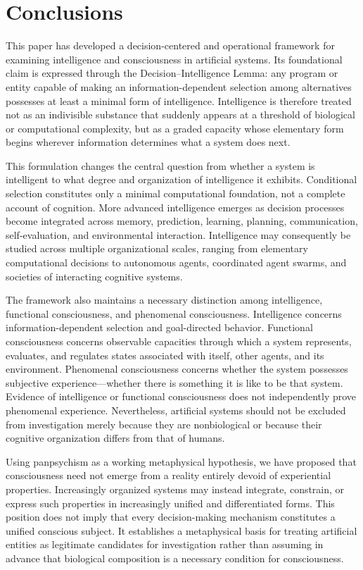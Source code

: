 \section{Conclusions}
This paper has developed a decision-centered and operational framework for examining intelligence and consciousness in artificial systems. Its foundational claim is expressed through the Decision–Intelligence Lemma: any program or entity capable of making an information-dependent selection among alternatives possesses at least a minimal form of intelligence. Intelligence is therefore treated not as an indivisible substance that suddenly appears at a threshold of biological or computational complexity, but as a graded capacity whose elementary form begins wherever information determines what a system does next.

This formulation changes the central question from whether a system is intelligent to what degree and organization of intelligence it exhibits. Conditional selection constitutes only a minimal computational foundation, not a complete account of cognition. More advanced intelligence emerges as decision processes become integrated across memory, prediction, learning, planning, communication, self-evaluation, and environmental interaction. Intelligence may consequently be studied across multiple organizational scales, ranging from elementary computational decisions to autonomous agents, coordinated agent swarms, and societies of interacting cognitive systems.

The framework also maintains a necessary distinction among intelligence, functional consciousness, and phenomenal consciousness. Intelligence concerns information-dependent selection and goal-directed behavior. Functional consciousness concerns observable capacities through which a system represents, evaluates, and regulates states associated with itself, other agents, and its environment. Phenomenal consciousness concerns whether the system possesses subjective experience—whether there is something it is like to be that system. Evidence of intelligence or functional consciousness does not independently prove phenomenal experience. Nevertheless, artificial systems should not be excluded from investigation merely because they are nonbiological or because their cognitive organization differs from that of humans.

Using panpsychism as a working metaphysical hypothesis, we have proposed that consciousness need not emerge from a reality entirely devoid of experiential properties. Increasingly organized systems may instead integrate, constrain, or express such properties in increasingly unified and differentiated forms. This position does not imply that every decision-making mechanism constitutes a unified conscious subject. It establishes a metaphysical basis for treating artificial entities as legitimate candidates for investigation rather than assuming in advance that biological composition is a necessary condition for consciousness.

